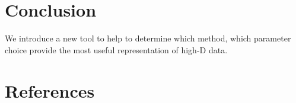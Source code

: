 \documentclass[
  12pt]{article}
\begin{document}
\hypertarget{sec-conclusion}{%
\section{Conclusion}\label{sec-conclusion}}

We introduce a new tool to help to determine which method, which
parameter choice provide the most useful representation of high-D data.

\hypertarget{references}{%
\section*{References}\label{references}}

\renewcommand{\bibsection}{}


\newpage{}
\end{document}
